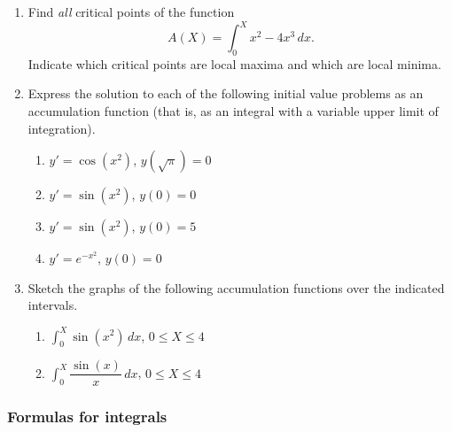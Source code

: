 \begin{enumerate}
\item Find {\em all\/} critical points of the function
	\[
A(X) = \int_0^X x^2-4x^3 \, dx.
\]
Indicate which critical points are local maxima and which are local minima.  




\item Express the solution to each of the following initial value
problems as an accumulation function (that is, as an integral with a
variable upper limit of integration).



  \begin{enumerate}
  \item $y' = \cos(x^2)$, \quad $y(\sqrt{\pi}) = 0$


  \item $y' = \sin(x^2)$, \quad $y(0) = 0$


  \item $y' = \sin(x^2)$, \quad $y(0) = 5$


  \item $y' = e^{-x^2}$, \quad $y(0) = 0$
\mbox{}



\end{enumerate}
\item Sketch the graphs of the following accumulation functions over
the indicated intervals.

  \begin{enumerate}
  \item ${\displaystyle\int_0^X \sin(x^2) \, dx}$, \quad $0 \leq X \leq
4$


  \item ${\displaystyle\int_0^X \dfrac{\sin(x)}{x} \, dx}$, \quad $0 \leq
X \leq 4$


\end{enumerate}
\end{enumerate}
\subsubsection{Formulas for integrals}
\label{subsubsec:formulas-for-integrals}





